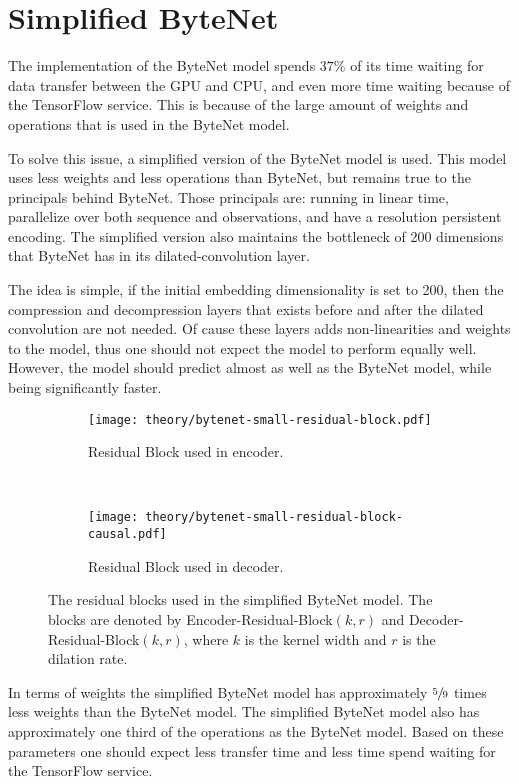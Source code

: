 \section{Simplified ByteNet}

The implementation of the ByteNet model spends $37\%$ of its time waiting for data transfer between the GPU and CPU, and even more time waiting because of the TensorFlow service. This is because of the large amount of weights and operations that is used in the ByteNet model.

To solve this issue, a simplified version of the ByteNet model is used. This model uses less weights and less operations than ByteNet, but remains true to the principals behind ByteNet. Those principals are: running in linear time, parallelize over both sequence and observations, and have a resolution persistent encoding. The simplified version also maintains the bottleneck of 200 dimensions that ByteNet has in its dilated-convolution layer.

The idea is simple, if the initial embedding dimensionality is set to 200, then the compression and decompression layers that exists before and after the dilated convolution are not needed. Of cause these layers adds non-linearities and weights to the model, thus one should not expect the model to perform equally well. However, the model should predict almost as well as the ByteNet model, while being significantly faster.

\begin{figure}[H]
    \centering
    \begin{subfigure}[b]{0.45\textwidth}
        \centering
        \texttt{[image: theory/bytenet-small-residual-block.pdf]}
        \caption{Residual Block used in encoder.}
    \end{subfigure}
    ~ %
    \begin{subfigure}[b]{0.45\textwidth}
        \centering
        \texttt{[image: theory/bytenet-small-residual-block-causal.pdf]}
        \caption{Residual Block used in decoder.}
    \end{subfigure}
    \caption{The residual blocks used in the simplified ByteNet model. The blocks are denoted by Encoder-Residual-Block$(k,r)$ and Decoder-Residual-Block$(k,r)$, where $k$ is the kernel width and $r$ is the dilation rate.}
    \label{fig:result:simple-bytenet:residual-block}
\end{figure}

In terms of weights the simplified ByteNet model has approximately $\sfrac{5}{9}$ times less weights than the ByteNet model. The simplified ByteNet model also has approximately one third of the operations as the ByteNet model. Based on these parameters one should expect less transfer time and less time spend waiting for the TensorFlow service.

